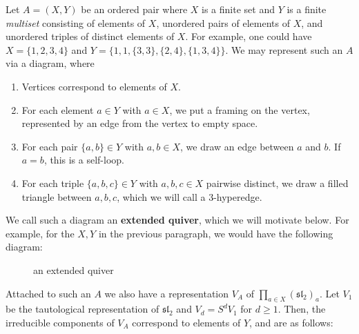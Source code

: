 \documentclass[12pt]{article}
\renewcommand{\sl}{\mathfrak{sl}}
\theoremstyle{definition}
\theoremstyle{remark}
\begin{document}
Let $A=(X,Y)$ be an ordered pair where $X$ is a finite set and $Y$ is a finite {\emph{multiset}} consisting of elements of $X$, unordered pairs of elements of $X$, and unordered triples of distinct elements of $X$. For example, one could have $X=\{1,2,3,4\}$ and $Y=\{1,1,\{3,3\},\{2,4\},\{1,3,4\}\}$. We may represent such an $A$ via a diagram, where

\begin{enumerate}
    \item Vertices correspond to elements of $X$.
    \item For each element $a\in Y$ with $a\in X$, we put a framing on the vertex, represented by an edge from the vertex to empty space.
    \item For each pair $\{a,b\}\in Y$ with $a,b\in X$, we draw an edge between $a$ and $b$. If $a=b$, this is a self-loop.
    \item For each triple $\{a,b,c\}\in Y$ with $a,b,c\in X$ pairwise distinct, we draw a filled triangle between $a,b,c$, which we will call a $3$-hyperedge.
\end{enumerate}

We call such a diagram an \textbf{extended quiver}, which we will motivate below. For example, for the $X,Y$ in the previous paragraph, we would have the following diagram:

\begin{figure}[H]
    \centering
    {\caption{an extended quiver}\label{extquiver}}
\end{figure}

Attached to such an $A$ we also have a representation $V_A$ of $\prod_{a\in X}(\sl_2)_a$. Let $V_1$ be the tautological representation of $\sl_2$ and $V_d=S^dV_1$ for $d\geq 1$. Then, the irreducible components of $V_A$ correspond to elements of $Y$, and are as follows:
\end{document}

